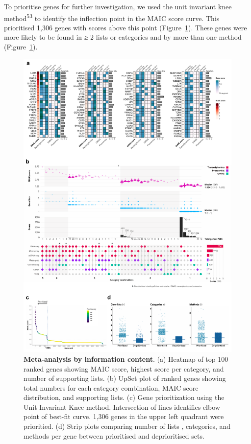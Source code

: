 \documentclass[
  11,
  a4paper,
]{article}
\begin{document}
To prioritise genes for further investigation, we used the unit
invariant knee method\textsuperscript{53} to identify the inflection
point in the MAIC score curve. This prioritised 1,306 genes with scores
above this point (Figure~\ref{fig-fig1}). These genes were more likely
to be found in ≥ 2 lists or categories and by more than one method
(Figure~\ref{fig-fig1}).

\begin{figure}

{\centering \includegraphics{./img/Figure_1.png}

}

\caption{\label{fig-fig1}\textbf{Meta-analysis by information content}.
(a) Heatmap of top 100 ranked genes showing MAIC score, highest score
per category, and number of supporting lists. (b) UpSet plot of ranked
genes showing total numbers for each category combination, MAIC score
distribution, and supporting lists. (c) Gene prioritization using the
Unit Invariant Knee method. Intersection of lines identifies elbow point
of best-fit curve. 1,306 genes in the upper left quadrant were
prioritied. (d) Strip plots comparing number of lists , categories, and
methods per gene between prioritised and deprioritised sets.}

\end{figure}
\end{document}
